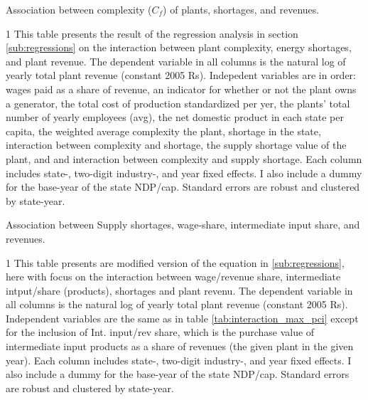 \documentclass[11pt]{article}
\begin{document}
\begin{sidewaystable}
	\begin{center}
		\begin{threeparttable}
		\caption{Association between complexity ($C_{f}$) of plants, shortages, and revenues.}
			\label{tab:interaction_avg_pci}
			
			\begin{tablenotes} \footnotesize
			\item[1] This table presents the result of the regression analysis in section \ref{sub:regressions} on the interaction between plant complexity, energy shortages, and plant revenue. The dependent variable in all columns is the natural log of yearly total plant revenue (constant 2005 Rs). Indepedent variables are in order: wages paid as a share of revenue, an indicator for whether or not the plant owns a generator, the total cost of production standardized per yer, the plants' total number of yearly employees (avg), the net domestic product in each state per capita, the weighted average complexity the plant, shortage in the state, interaction between complexity and shortage, the supply shortage value of the plant, and and interaction between complexity and supply shortage. Each column includes state-, two-digit industry-, and year fixed effects. I also include a dummy for the base-year of the state NDP/cap. Standard errors are robust and clustered by state-year.
			\end{tablenotes}
		\end{threeparttable}
	\end{center}
\end{sidewaystable}

\begin{table}
	\begin{center}
		\begin{threeparttable}
		\caption{Association between Supply shortages, wage-share, intermediate input share, and revenues.}
			\label{tab:interaction_wage_input}
			
			\begin{tablenotes} \footnotesize
			\item[1] This table presents are modified version of the equation in \ref{sub:regressions}, here with focus on the interaction between wage/revenue share, intermediate intput/share (products), shortages and plant revenu. The dependent variable in all columns is the natural log of yearly total plant revenue (constant 2005 Rs). Independent variables are the same as in table \ref{tab:interaction_max_pci} except for the inclusion of Int. input/rev share, which is the purchase value of intermediate input products as a share of revenues (the given plant in the given year). Each column includes state-, two-digit industry-, and year fixed effects. I also include a dummy for the base-year of the state NDP/cap. Standard errors are robust and clustered by state-year.
			\end{tablenotes}
		\end{threeparttable}
	\end{center}
\end{table}
\end{document}
